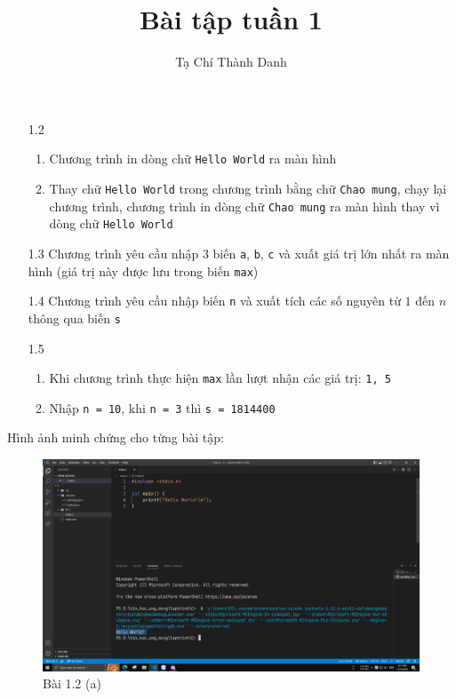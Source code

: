 \documentclass[a4paper, 12pt, notitlepage]{article}
\title{Bài tập tuần 1}
\author{Tạ Chí Thành Danh}
\begin{document}
	\maketitle
	\begin{enumerate}[font=\bfseries]
		\item[1.2]
		\begin{enumerate}
			\item Chương trình in dòng chữ \verb|Hello World| ra màn hình
			\item Thay chữ \verb|Hello World| trong chương trình bằng chữ \verb|Chao mung|, chạy lại chương trình, chương trình in dòng chữ \verb|Chao mung| ra màn hình thay vì dòng chữ \verb|Hello World|
		\end{enumerate}
		\item[1.3] Chương trình yêu cầu nhập 3 biến \verb|a|, \verb|b|, \verb|c| và xuất giá trị lớn nhất ra màn hình (giá trị này được lưu trong biến \verb|max|) 
		\item[1.4] Chương trình yêu cầu nhập biến \verb|n| và xuất tích các số nguyên từ $1$ đến $n$ thông qua biến \verb|s|
		\item[1.5] 
		\begin{enumerate}
			\item Khi chương trình thực hiện \verb|max| lần lượt nhận các giá trị: \verb|1, 5|
			\item Nhập \verb|n = 10|, khi \verb|n = 3| thì \verb|s = 1814400|
		\end{enumerate} 
	\end{enumerate}
	Hình ảnh minh chứng cho từng bài tập:
	\begin{figure}[h]
		\begin{center}
			\includegraphics[scale=0.28]{Screenshot_(1346).png}
		\end{center}
		\caption{Bài 1.2 (a)}
	\end{figure}
\end{document}
